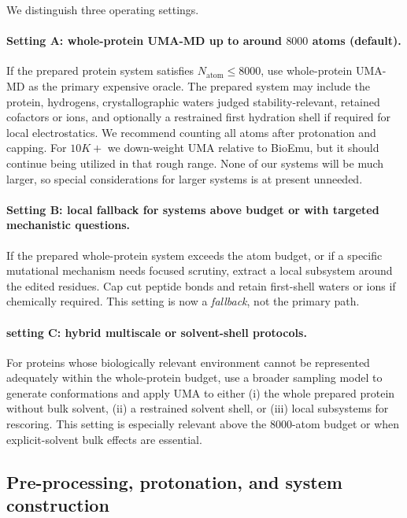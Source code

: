 \documentclass[11pt]{article}
\begin{document}
We distinguish three operating settings.

\paragraph{Setting A: whole-protein UMA-MD up to around $8000$ atoms (default).}
If the prepared protein system satisfies $N_{\mathrm{atom}}\leq 8000$, use whole-protein UMA-MD as the primary expensive oracle. The prepared system may include the protein, hydrogens, crystallographic waters judged stability-relevant, retained cofactors or ions, and optionally a restrained first hydration shell if required for local electrostatics. We recommend counting all atoms after protonation and capping. For $10K+$ we down-weight UMA relative to BioEmu, but it should continue being utilized in that rough range. None of our systems will be much larger, so special considerations for larger systems is at present unneeded. 

\paragraph{Setting B: local fallback for systems above budget or with targeted mechanistic questions.}
If the prepared whole-protein system exceeds the atom budget, or if a specific mutational mechanism needs focused scrutiny, extract a local subsystem around the edited residues. Cap cut peptide bonds and retain first-shell waters or ions if chemically required. This setting is now a \emph{fallback}, not the primary path.

\paragraph{setting C: hybrid multiscale or solvent-shell protocols.}
For proteins whose biologically relevant environment cannot be represented adequately within the whole-protein budget, use a broader sampling model to generate conformations and apply UMA to either (i) the whole prepared protein without bulk solvent, (ii) a restrained solvent shell, or (iii) local subsystems for rescoring. This setting is especially relevant above the $8000$-atom budget or when explicit-solvent bulk effects are essential.

\subsection{Pre-processing, protonation, and system construction}
\end{document}

